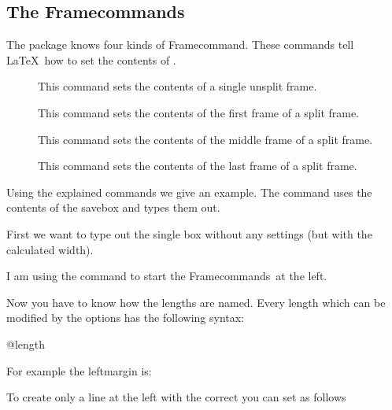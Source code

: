 \documentclass[parskip=false,english,11pt]{ltxmdf}
\begin{document}
\subsection{The Framecommands}
The package  knows four kinds of \glqq Framecommand\grqq. These commands tell \LaTeX\ how to set the contents of . 
\begin{description}
       \item[] This command sets the contents of a single unsplit frame.
       \item[]  This command sets the contents of the first frame of a split frame.
       \item[] This command sets the contents of the middle frame of a split frame.
       \item[] This command sets the contents of the last frame of a split frame.
\end{description}

Using the explained commands we give an example. The command  uses the contents of the savebox and types them out. 

First we want to type out the single box without any settings (but with the calculated width).
\begin{mdexample}
\makeatletter
 \def\md@putbox@single{\box\@tempboxa}
\makeatother
\end{mdexample}
I am using the command  to start the \glqq Framecommands\grqq\ at the left.
\begin{mdexample}[deletekeywords={leftline},moretexcs={leftline}]
\makeatletter
 \def\md@putbox@single{\leftline{\box\@tempboxa}}
\makeatother
\end{mdexample}

Now you have to know how the lengths are named. Every length which can be modified by the options has the following syntax:
\begin{mdexample}
@length
\end{mdexample}
For example the leftmargin is:
\begin{mdexample}
\mdf@leftmargin@length
\end{mdexample}

To create only a line at the left with the correct  you can set  as follows

\begin{mdexample}[deletekeywords={leftline},moretexcs={leftline}]
\makeatletter
\def\md@putbox@single{%
         \leftline{%
             \hspace*{\mdf@leftmargin@length}%
             \rule[-\dp\@tempboxa]{\mdf@linewidth}%
                  {\ht\@tempboxa+\dp\@tempboxa}%
             \box\@tempboxa
         }%
}
\makeatother
\end{mdexample}
\end{document}
